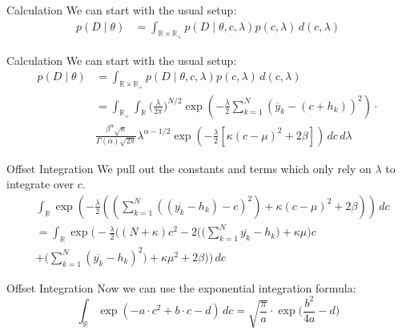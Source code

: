 \documentclass{beamer}
\newcommand{\y}{\overline{y}}
\newcommand{\R}{\mathbb{R}}
\begin{document}
	\begin{frame}{Calculation}
  		We can start with the usual setup:
  		\begin{align}
    		p(D \mid \theta) &= \int_{\R \times \R_+} p(D \mid \theta,c,\lambda) 				p(c, \lambda) \, d(c, \lambda)
		\end{align}
  	\end{frame}  	
  	
  	\begin{frame}{Calculation}
  		We can start with the usual setup:
  		\begin{align}
    		p(D \mid \theta) &= \int_{\R \times \R_+} p(D \mid \theta,c,\lambda) 				p(c, \lambda) \, d(c, \lambda) \\
    		&= \int_{\R_+} \int_\R \biggl(\frac{\lambda}{2\pi}\biggr)^{N/2} \exp				\left( - \frac{\lambda}{2} \sum_{k = 1}^N (\y_k - (c + h_k))^2 \right) 			\cdot \\
    		& \frac{\beta^\alpha \sqrt{\kappa}}{\Gamma(\alpha)\sqrt{2\pi}} 						\lambda^{\alpha-1/2} \exp\left(- \frac{\lambda}{2} [\kappa (c - \mu)^2 			+ 2\beta] \right) \, dc \, d\lambda
		\end{align}
  	\end{frame}
  	
  	\begin{frame}{Offset Integration}
  		We pull out the constants and terms which only rely on $\lambda$ to 				integrate over $c$.
  		\begin{align}
   			& \int_\R \exp \left( -\frac{\lambda}{2} \left( \left( \sum_{k = 1}^N 				((\overline{y_k} - h_k)  - c)^2 \right) + \kappa(c - \mu)^2 +2\beta 				\right) \right) \, dc \\
    		&= \int_\R \exp \Biggl( -\frac{\lambda}{2} \Biggl( (N + \kappa) c^2 - 				2 \Biggl(\Biggl(\sum_{k = 1}^N \overline{y_k}-h_k \Biggr) + \kappa \mu 			\Biggr) c \\
    		&+ \Biggl( \sum_{k = 1}^N (\overline{y_k} - h_k)^2 \Biggr) + \kappa 				\mu^2 + 2\beta \Biggr) \Biggr) \, dc
		\end{align}
  	\end{frame}
  	
  	\begin{frame}{Offset Integration}
  		Now we can use the exponential integration formula:
  		\[
  			\int_\R \exp(-a \cdot c^2 + b \cdot c - d) \, dc = \sqrt{\frac{\pi}					{a}} \cdot \exp \biggl( \frac{b^2}{4a} - d \biggr)
  		\]
  	\end{frame}  	
  	
\end{document}
